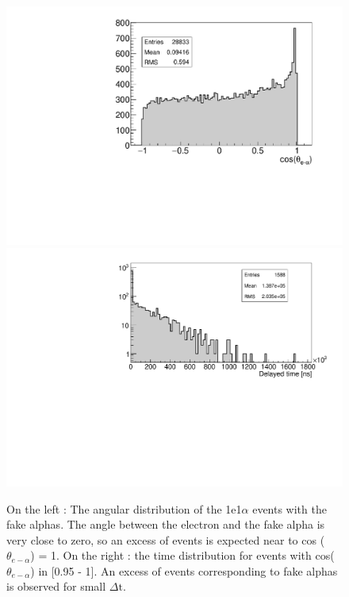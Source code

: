 \documentclass[main.tex]{subfiles}
\begin{document}
\begin{figure}[h!]
\begin{center}
\includegraphics[scale=0.312]{pictures/Chap5/angle.pdf}
\includegraphics[scale=0.38]{pictures/Chap5/delayedTime.pdf}
\caption{On the left : The angular distribution of the 1e1$\alpha$ events with the fake alphas. The angle between the electron and the fake alpha is very close to zero, so an excess of events is expected near to  cos ($\theta_{e-\alpha}$) = 1. On the right : the time distribution for events with cos($\theta_{e-\alpha}$) in [0.95 - 1]. An excess of events corresponding to fake alphas is observed for small $\Delta \text{t}$.} 
\label{angularDistribution}
\end{center}
\end{figure}
\end{document}
